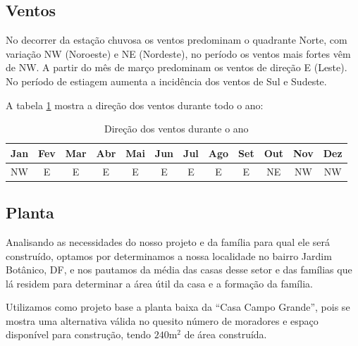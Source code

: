 \subsection{Ventos}

	No decorrer da estação chuvosa os ventos predominam o quadrante Norte, com variação NW (Noroeste)  e NE (Nordeste), no período os ventos mais fortes vêm de NW. A partir do mês de março predominam os ventos de direção E (Leste). No período de estiagem aumenta a incidência dos ventos de Sul e Sudeste.

	A tabela \ref{direcao_ventos}\cite{2015Instituto} mostra a direção dos ventos durante todo o ano:

\begin{table}[H]
\begin{tabular}{|c|c|c|c|c|c|c|c|c|c|c|c|}
\hline 
Jan & Fev & Mar & Abr & Mai & Jun & Jul & Ago & Set & Out & Nov & Dez\tabularnewline
\hline 
\hline 
NW & E & E & E & E & E & E & E & E & NE & NW & NW\tabularnewline
\hline 
\end{tabular}
\caption{Direção dos ventos durante o ano}
\label{direcao_ventos}
\end{table}

\subsection{Planta}

	Analisando as necessidades do nosso projeto e da família para qual ele será construído, optamos por determinamos a nossa localidade no bairro Jardim Botânico, DF, e nos pautamos da média das casas desse setor e das famílias que lá residem para determinar a área útil da casa e a formação da família.

	Utilizamos como projeto base a planta baixa da “Casa Campo Grande”\cite{plantaCasa}, pois se mostra uma alternativa válida no quesito número de moradores e espaço disponível para construção, tendo $240\si{\meter}^{2}$ de área construída.

